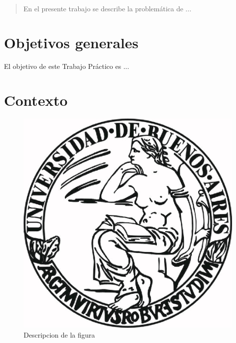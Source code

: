 \documentclass[a4paper]{article}
\begin{document}
\thispagestyle{empty}

\maketitle
\newpage

\thispagestyle{empty}
\vfill
\begin{abstract}
En el presente trabajo se describe la problemática de ...
\end{abstract}

\thispagestyle{empty}
\vspace{3cm}
\tableofcontents
\newpage


\newpage

\section{Objetivos generales}

El objetivo de este Trabajo Práctico es ...


\section{Contexto}

\begin{figure}
  \begin{center}
	\includegraphics[scale=0.66]{imagenes/logouba.jpg}
	\caption{Descripcion de la figura}
	\label{nombreparareferenciar}
  \end{center}
\end{figure}
\end{document}
